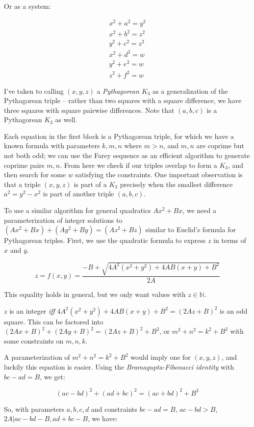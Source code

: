 \documentclass[a4paper]{amsproc}
\theoremstyle{plain}
\theoremstyle{named}
\newcommand{\N} {\mathbb{N}}
\begin{document}
Or as a system:

$$
\begin{matrix}
x^2 + a^2 = y^2 \\
x^2 + b^2 = z^2 \\
y^2 + c^2 = z^2 \\
x^2 + d^2 = w \\
y^2 + e^2 = w \\
z^2 + f^2 = w
\end{matrix}
$$

I've taken to calling $(x,y,z)$ a \textit{Pythagorean $K_3$} as a generalization of the Pythagorean triple --
rather than two squares with a square difference, we have three squares with square pairwise differences.
Note that $(a,b,c)$ is a Pythagorean $K_3$ as well.

Each equation in the first block is a Pythagorean triple, for which we have a known formula with parameters $k,m,n$ where $m > n$, and $m,n$ are coprime but not both odd;
we can use the Farey sequence as an efficient algorithm to generate coprime pairs $m,n$.
From here we check if our triples overlap to form a $K_3$, and then search for some $w$ satisfying the constraints.
One important observation is that a triple $(x,y,z)$ is part of a $K_3$ precisely when the smallest difference $a^2 = y^2 - x^2$ is part of another
triple $(a,b,c)$.

To use a similar algorithm for general quadratics $Ax^2+Bx$, we need a parameterization of integer solutions to $(Ax^2+Bx) + (Ay^2+By) = (Az^2+Bz)$
similar to Euclid's formula for Pythagorean triples.
First, we use the quadratic formula to express $z$ in terms of $x$ and $y$.

$$z = f(x,y) = \frac{-B+\sqrt{4A^2(x^2+y^2)+4AB(x+y)+B^2}}{2A}$$

This equality holds in general, but we only want values with $z\in\N$.

$z$ is an integer \textit{iff} $4A^2(x^2+y^2)+4AB(x+y)+B^2=(2Az+B)^2$ is an odd square.
This can be factored into $(2Ax+B)^2+(2Ay+B)^2=(2Az+B)^2+B^2$, or $m^2+n^2=k^2+B^2$ with some constraints on $m,n,k$.

A parameterization of $m^2+n^2=k^2+B^2$ would imply one for $(x,y,z)$, and luckily this equation is easier.
Using the \textit{Bramagupta-Fibonacci identity} with ${bc-ad=B}$, we get:

$$(ac-bd)^2 + (ad+bc)^2 = (ac+bd)^2 + B^2$$

So, with parameters $a,b,c,d$ and constraints $bc-ad=B$, $ac-bd> B$, ${2A\vert ac-bd-B}, ad+bc-B$, we have:
\end{document}
